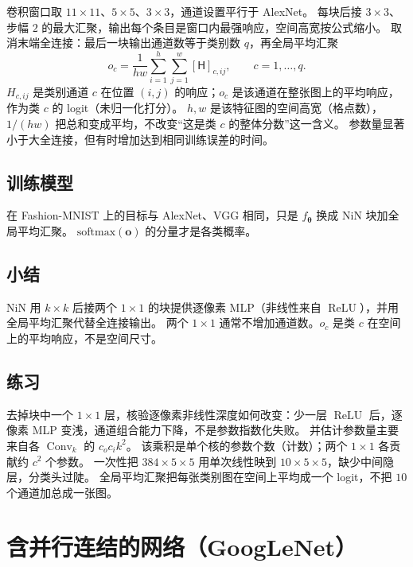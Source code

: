 卷积窗口取 $11\times 11$、$5\times 5$、$3\times 3$，通道设置平行于 AlexNet。
每块后接 $3\times 3$、步幅 $2$ 的最大汇聚，输出每个条目是窗口内最强响应，空间高宽按公式缩小。
取消末端全连接：最后一块输出通道数等于类别数 $q$，再全局平均汇聚
\[
o_c
=
\frac{1}{hw}\sum_{i=1}^{h}\sum_{j=1}^{w}[\mathsf{H}]_{c,ij},
\qquad
c=1,\ldots,q.
\]
$H_{c,ij}$ 是类别通道 $c$ 在位置 $(i,j)$ 的响应；$o_c$ 是该通道在整张图上的平均响应，作为类 $c$ 的 logit（未归一化打分）。
$h,w$ 是该特征图的空间高宽（格点数），$1/(hw)$ 把总和变成平均，不改变“这是类 $c$ 的整体分数”这一含义。
参数量显著小于大全连接，但有时增加达到相同训练误差的时间。

\subsection{训练模型}

在 Fashion-MNIST 上的目标与 AlexNet、VGG 相同，只是 $f_{\bm{\theta}}$ 换成 NiN 块加全局平均汇聚。
$\mathrm{softmax}(\bm{o})$ 的分量才是各类概率。

\subsection{小结}

NiN 用 $k\times k$ 后接两个 $1\times 1$ 的块提供逐像素 MLP（非线性来自 $\operatorname{ReLU}$），并用全局平均汇聚代替全连接输出。
两个 $1\times 1$ 通常不增加通道数。$o_c$ 是类 $c$ 在空间上的平均响应，不是空间尺寸。

\subsection{练习}

去掉块中一个 $1\times 1$ 层，核验逐像素非线性深度如何改变：少一层 $\operatorname{ReLU}$ 后，逐像素 MLP 变浅，通道组合能力下降，不是参数指数化失败。
并估计参数量主要来自各 $\operatorname{Conv}_{k}$ 的 $c_o c_i k^{2}$。
该乘积是单个核的参数个数（计数）；两个 $1\times 1$ 各贡献约 $c^{2}$ 个参数。
一次性把 $384\times 5\times 5$ 用单次线性映到 $10\times 5\times 5$，缺少中间隐层，分类头过陡。
全局平均汇聚把每张类别图在空间上平均成一个 logit，不把 $10$ 个通道加总成一张图。

\section{含并行连结的网络（GoogLeNet）}



